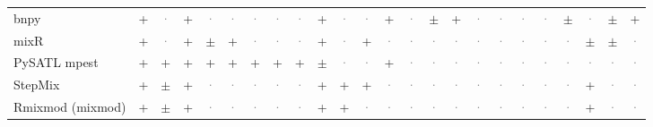 \documentclass[10pt,a4paper]{article}
\begin{document}
\begin{landscape}
{\begin{longtable}{@{}l *{23}{c}@{}}
bnpy & \cellcolor{yes!35}+ & \textcolor{gray}{·} & \cellcolor{yes!35}+ & \textcolor{gray}{·} & \textcolor{gray}{·} & \textcolor{gray}{·} & \textcolor{gray}{·} & \textcolor{gray}{·} & \cellcolor{yes!35}+ & \textcolor{gray}{·} & \textcolor{gray}{·} & \cellcolor{yes!35}+ & \textcolor{gray}{·} & \cellcolor{part!45}$\pm$ & \cellcolor{yes!35}+ & \textcolor{gray}{·} & \textcolor{gray}{·} & \textcolor{gray}{·} & \textcolor{gray}{·} & \cellcolor{part!45}$\pm$ & \textcolor{gray}{·} & \cellcolor{part!45}$\pm$ & \cellcolor{yes!35}+ \\
mixR & \cellcolor{yes!35}+ & \textcolor{gray}{·} & \cellcolor{yes!35}+ & \cellcolor{part!45}$\pm$ & \cellcolor{yes!35}+ & \textcolor{gray}{·} & \textcolor{gray}{·} & \textcolor{gray}{·} & \cellcolor{yes!35}+ & \textcolor{gray}{·} & \cellcolor{yes!35}+ & \textcolor{gray}{·} & \textcolor{gray}{·} & \textcolor{gray}{·} & \textcolor{gray}{·} & \textcolor{gray}{·} & \textcolor{gray}{·} & \textcolor{gray}{·} & \textcolor{gray}{·} & \textcolor{gray}{·} & \cellcolor{part!45}$\pm$ & \cellcolor{part!45}$\pm$ & \textcolor{gray}{·} \\
PySATL mpest & \cellcolor{yes!35}+ & \cellcolor{yes!35}+ & \cellcolor{yes!35}+ & \cellcolor{yes!35}+ & \cellcolor{yes!35}+ & \cellcolor{yes!35}+ & \cellcolor{yes!35}+ & \cellcolor{yes!35}+ & \cellcolor{part!45}$\pm$ & \textcolor{gray}{·} & \textcolor{gray}{·} & \cellcolor{yes!35}+ & \textcolor{gray}{·} & \textcolor{gray}{·} & \textcolor{gray}{·} & \textcolor{gray}{·} & \textcolor{gray}{·} & \textcolor{gray}{·} & \textcolor{gray}{·} & \textcolor{gray}{·} & \textcolor{gray}{·} & \textcolor{gray}{·} & \textcolor{gray}{·} \\
StepMix & \cellcolor{yes!35}+ & \cellcolor{part!45}$\pm$ & \cellcolor{yes!35}+ & \textcolor{gray}{·} & \textcolor{gray}{·} & \textcolor{gray}{·} & \textcolor{gray}{·} & \textcolor{gray}{·} & \cellcolor{yes!35}+ & \cellcolor{yes!35}+ & \cellcolor{yes!35}+ & \textcolor{gray}{·} & \textcolor{gray}{·} & \textcolor{gray}{·} & \textcolor{gray}{·} & \textcolor{gray}{·} & \textcolor{gray}{·} & \textcolor{gray}{·} & \textcolor{gray}{·} & \textcolor{gray}{·} & \cellcolor{yes!35}+ & \textcolor{gray}{·} & \textcolor{gray}{·} \\
Rmixmod (mixmod) & \cellcolor{yes!35}+ & \cellcolor{part!45}$\pm$ & \cellcolor{yes!35}+ & \textcolor{gray}{·} & \textcolor{gray}{·} & \textcolor{gray}{·} & \textcolor{gray}{·} & \textcolor{gray}{·} & \cellcolor{yes!35}+ & \cellcolor{yes!35}+ & \textcolor{gray}{·} & \textcolor{gray}{·} & \textcolor{gray}{·} & \textcolor{gray}{·} & \textcolor{gray}{·} & \textcolor{gray}{·} & \textcolor{gray}{·} & \textcolor{gray}{·} & \textcolor{gray}{·} & \textcolor{gray}{·} & \cellcolor{yes!35}+ & \textcolor{gray}{·} & \textcolor{gray}{·} \\

\end{longtable}}
\end{landscape}
\end{document}
